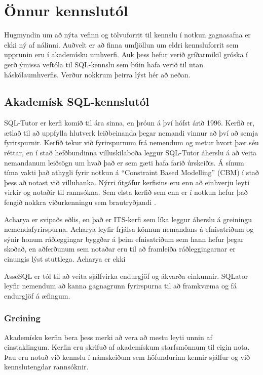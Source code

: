 \documentclass[a4paper,12pt,twoside,BCOR=10mm]{scrbook}
\begin{document}
\section{Önnur kennslutól}
Hugmyndin um að nýta vefinn og tölvuforrit til kennslu í notkun gagnasafna er ekki ný af nálinni. Auðvelt er að finna umfjöllun um eldri kennsluforrit sem upprunin eru í akademísku umhverfi. Auk þess hefur verið gríðarmikil gróska í gerð ýmissa veftóla til SQL-kennslu sem búin hafa verið til utan háskólaumhverfis. Verður nokkrum þeirra lýst hér að neðan.

\subsection{Akademísk SQL-kennslutól}
SQL-Tutor \cite{mitrovic1998} er kerfi komið til ára sinna, en þróun á því hófst árið 1996. Kerfið er, ætlað til að uppfylla hlutverk leiðbeinanda þegar nemandi vinnur að því að semja fyrirspurnir. Kerfið tekur við fyrirspurnum frá nemendum og metur hvort þær séu réttar, en í stað hefðbundinna villuskilaboða leggur SQL-Tutor áherslu á að veita nemandanum leiðsögn um hvað það er sem gæti hafa farið úrskeiðis. Á sínum tíma vakti það athygli fyrir notkun á ``Constraint Based Modelling'' (CBM) í stað þess að notast við villubanka. Nýrri útgáfur kerfisins eru enn að einhverju leyti virkir og notaðir til rannsókna. Sem elsta kerfið sem enn er í notkun hefur það fengið nokkra viðurkenningu sem brautryðjandi \cite{mitrovic2016implementing}.

Acharya\cite{bhagat2002} er svipaðs eðlis, en það er ITS-kerfi sem líka leggur áherslu á greiningu nemendafyrirspurna. Acharya leyfir frjálsa könnun nemandans á efnisatriðum og sýnir honum ráðleggingar byggðar á þeim efnisatriðum sem hann hefur þegar skoðað, en aðferðunum sem notaðar eru til að framleiða ráðleggingarnar er einungis lýst stuttlega. Acharya er ekki 

AsseSQL \cite{prior2014assesql} er tól til að veita sjálfvirka endurgjöf og ákvarða einkunnir. SQLator \cite{sadiq2004sqlator} leyfir nemendum að kanna gagnagrunn fyrirspurna til að framkvæma og fá endurgjöf á æfingum.

\subsubsection{Greining}
Akademísku kerfin bera þess merki að vera að mestu leyti unnin af einstaklingum. Kerfin eru skrifuð af akademískum starfsmönnum til eigin nota. Þau eru notuð við kennslu í námskeiðum sem höfundurinn kennir sjálfur og við kennslutengdar rannsóknir.
\end{document}
